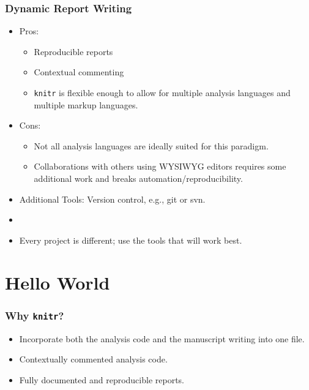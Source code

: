 \documentclass[t]{beamer}\usepackage[]{graphicx}\usepackage[]{color}
\begin{document}
\begin{frame} 
  \frametitle{Dynamic Report Writing}
  \begin{itemize}
    \item Pros: 
      \begin{itemize}
        \item Reproducible reports 
        \item Contextual commenting 
        \item {\tt knitr} is flexible enough to allow for multiple analysis languages
          and multiple markup languages.
      \end{itemize}
    \item Cons:
      \begin{itemize}
        \item Not all analysis languages are ideally suited for this paradigm.
        \item Collaborations with others using WYSIWYG editors requires some
          additional work and breaks automation/reproducibility.
      \end{itemize}
    \item Additional Tools: Version control, e.g., git or svn.
    \item[]
    \item Every project is different; use the tools that will work best.
  \end{itemize}
\end{frame}


\section{Hello World}
\begin{frame}
  \frametitle{Why {\tt knitr}?}
  \begin{itemize}
    \item Incorporate both the analysis code and the manuscript writing into one
      file.
    \item Contextually commented analysis code.
    \item Fully documented and reproducible reports.
  \end{itemize}
\end{frame}
\end{document}
